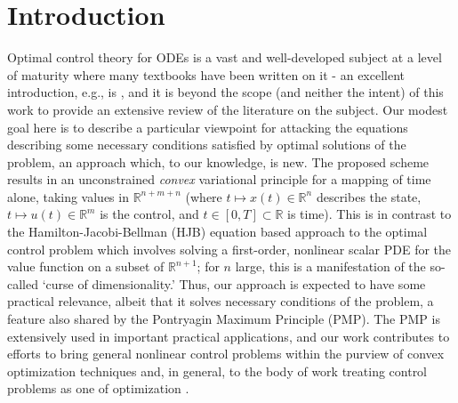 \documentclass[11pt]{article}
\newcommand{\R}{\mathbb R}
\begin{document}
\section{Introduction}
Optimal control theory for ODEs is a vast and well-developed subject at a level of maturity where many textbooks have been written on it - an excellent introduction, e.g., is \cite{evans1983introduction}, and it is beyond the scope (and neither the intent) of this work to provide an extensive review of the literature on the subject. Our modest goal here is to describe a particular viewpoint for attacking the equations describing some necessary conditions satisfied by optimal solutions of the problem, an approach which, to our knowledge, is new. The proposed scheme results in an unconstrained \emph{convex} variational principle for a mapping of time alone, taking values in $\R^{n+m+n}$ (where $t \mapsto x(t) \in \R^n$ describes the state, $t \mapsto u(t) \in \R^m$ is the control, and $t \in [0,T] \subset \R$ is time). This is in contrast to the Hamilton-Jacobi-Bellman (HJB) equation based approach to the optimal control problem which involves solving a first-order, nonlinear scalar PDE for the value function on a subset of $\R^{n+1}$; for $n$ large, this is a manifestation of the so-called `curse of dimensionality.'  Thus, our approach is expected to have some practical relevance, albeit that it solves necessary conditions of the problem, a feature also shared by the Pontryagin Maximum Principle (PMP). The PMP is extensively used in important practical applications, and our work contributes to efforts to bring general nonlinear control problems within the purview of convex optimization techniques \cite{malyuta2022convex} and, in general, to the body of work treating control problems as one of optimization \cite{cuthrell1987optimization}.
\end{document}
